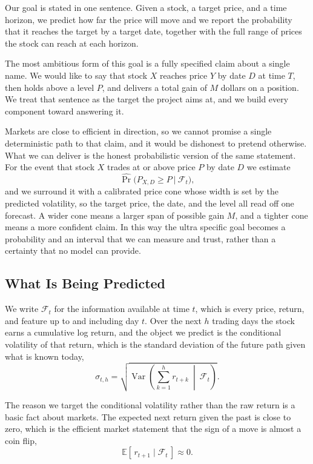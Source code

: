 \documentclass[12pt,letterpaper]{article}
\begin{document}
Our goal is stated in one sentence. Given a stock, a target price, and a time
horizon, we predict how far the price will move and we report the probability
that it reaches the target by a target date, together with the full range of
prices the stock can reach at each horizon.

The most ambitious form of this goal is a fully specified claim about a single
name. We would like to say that stock $X$ reaches price $Y$ by date $D$ at time
$T$, then holds above a level $P$, and delivers a total gain of $M$ dollars on a
position. We treat that sentence as the target the project aims at, and we build
every component toward answering it.

Markets are close to efficient in direction, so we cannot promise a single
deterministic path to that claim, and it would be dishonest to pretend
otherwise. What we can deliver is the honest probabilistic version of the same
statement. For the event that stock $X$ trades at or above price $P$ by date $D$
we estimate
\[
\boxed{\ \widehat{\Pr}\bigl(P_{X, D} \ge P \ \big|\ \mathcal{F}_t\bigr),\ }
\]
and we surround it with a calibrated price cone whose width is set by the
predicted volatility, so the target price, the date, and the level all read off
one forecast. A wider cone means a larger span of possible gain $M$, and a
tighter cone means a more confident claim. In this way the ultra specific goal
becomes a probability and an interval that we can measure and trust, rather than
a certainty that no model can provide.

\subsection{What Is Being Predicted}

We write $\mathcal{F}_t$ for the information available at time $t$, which is every
price, return, and feature up to and including day $t$. Over the next $h$ trading
days the stock earns a cumulative log return, and the object we predict is the
conditional volatility of that return, which is the standard deviation of the
future path given what is known today,
\[
\sigma_{t,h} = \sqrt{\operatorname{Var}\!\left(\sum_{k=1}^{h} r_{t+k}
\ \middle|\ \mathcal{F}_t\right)} .
\]

The reason we target the conditional volatility rather than the raw return is a
basic fact about markets. The expected next return given the past is close to
zero, which is the efficient market statement that the sign of a move is almost
a coin flip,
\[
\mathbb{E}\!\left[\,r_{t+1} \mid \mathcal{F}_t\,\right] \approx 0 .
\]
\end{document}
